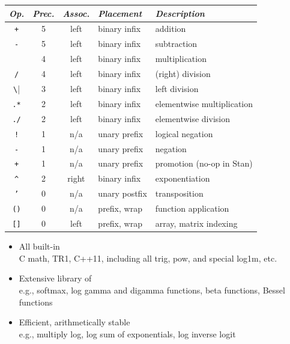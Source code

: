 \documentclass[10pt]{report}
\newcommand{\sld}[1]{\newpage{\noindent\LARGE \ \ \
    \textcolor{MidnightBlue}{\bfseries #1}}\vspace*{4pt}}
\newcommand{\code}[1]{{\tt #1}}
\newcommand{\spc}{\hspace*{0.25in}}
\newcommand{\myemph}[1]{{\color{MidnightBlue}{\bfseries #1}}}
\begin{document}
\sld{Arithmetic and Matrix Operators}
\vfill
\noindent\spc
{\footnotesize
\begin{tabular}{c|ccl|l}
{\it Op.} & {\it Prec.} & {\it Assoc.} & {\it
  Placement} & {\it Description}
\\ \hline \hline

\code{+} & 5 & left & binary infix & addition
\\
\code{-} & 5 & left & binary infix & subtraction
\\ \hline
\code{*} & 4 & left & binary infix & multiplication
\\
\code{/} & 4 & left & binary infix & (right) division
\\ \hline
\Verb|\| & 3 & left & binary infix & left division
\\ \hline
\code{.*} & 2 & left & binary infix & elementwise multiplication
\\
\code{./} & 2 & left & binary infix & elementwise division
\\ \hline
\code{!} & 1 & n/a & unary prefix & logical negation
\\
\code{-} & 1 & n/a & unary prefix & negation
\\ 
\code{+} & 1 & n/a & unary prefix & promotion (no-op in Stan)
\\ \hline
\Verb|^| & 2 & right & binary infix & exponentiation
\\ \hline
\code{'} & 0 & n/a & unary postfix & transposition
\\ \hline \hline
\code{()} & 0 & n/a & prefix, wrap & function application
\\
\code{[]} & 0 & left & prefix, wrap & array, matrix indexing
\end{tabular}
}
\vfill

\sld{Built-in Math Functions}

\begin{itemize}
\item All built-in \myemph{C++ functions}
\\
{\footnotesize C math, TR1, C++11, including all trig, pow, and
  special log1m, etc.}
\item Extensive library of \myemph{statistical functions}
\\
{\footnotesize e.g., softmax,
log gamma and digamma functions, beta functions, Bessel functions}
%
\item Efficient, arithmetically stable \myemph{compound functions}
\\
{\footnotesize e.g., multiply log, log sum of
exponentials, log inverse logit}
\end{itemize}
\end{document}
